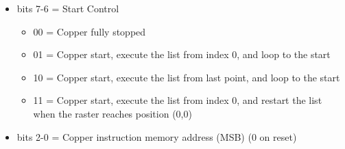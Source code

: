 \begin{itemize}
\item bits 7-6 = Start Control
  \begin{itemize}
  \item[] 00 = Copper fully stopped
  \item[] 01 = Copper start, execute the list from index 0, and loop
    to the start
  \item[] 10 = Copper start, execute the list from last point, and
    loop to the start
  \item[] 11 = Copper start, execute the list from index 0, and
    restart the list when the raster reaches position (0,0)
  \end{itemize}
\item bits 2-0 = Copper instruction memory address (MSB) (0 on reset)
\end{itemize}

